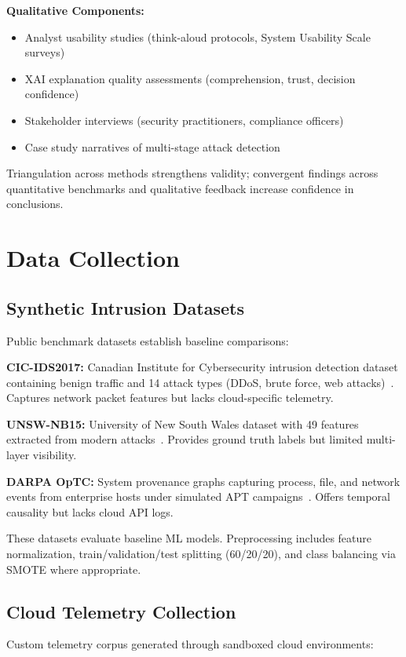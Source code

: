 \textbf{Qualitative Components:}
\begin{itemize}
    \item Analyst usability studies (think-aloud protocols, System Usability Scale surveys)
    \item XAI explanation quality assessments (comprehension, trust, decision confidence)
    \item Stakeholder interviews (security practitioners, compliance officers)
    \item Case study narratives of multi-stage attack detection
\end{itemize}

Triangulation across methods strengthens validity; convergent findings across quantitative benchmarks and qualitative feedback increase confidence in conclusions.

\section{Data Collection}\label{sec:method-data}
\subsection{Synthetic Intrusion Datasets}
Public benchmark datasets establish baseline comparisons:

\textbf{CIC-IDS2017:} Canadian Institute for Cybersecurity intrusion detection dataset containing benign traffic and 14 attack types (DDoS, brute force, web attacks)~\cite{sharafaldin2018cicids}. Captures network packet features but lacks cloud-specific telemetry.

\textbf{UNSW-NB15:} University of New South Wales dataset with 49 features extracted from modern attacks~\cite{moustafa2015unswvnb15}. Provides ground truth labels but limited multi-layer visibility.

\textbf{DARPA OpTC:} System provenance graphs capturing process, file, and network events from enterprise hosts under simulated APT campaigns~\cite{darpaoptc2020}. Offers temporal causality but lacks cloud API logs.

These datasets evaluate baseline ML models. Preprocessing includes feature normalization, train/validation/test splitting (60/20/20), and class balancing via SMOTE where appropriate.

\subsection{Cloud Telemetry Collection}
Custom telemetry corpus generated through sandboxed cloud environments:

